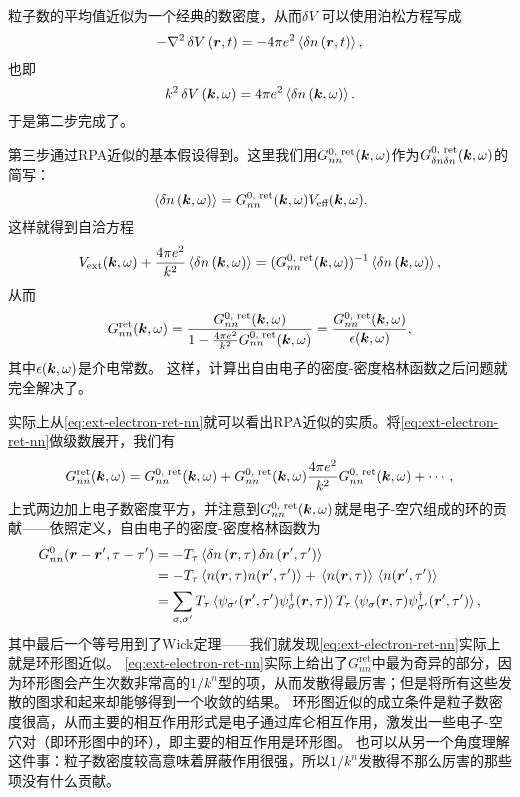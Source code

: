 \documentclass[hyperref, UTF8, a4paper]{ctexart}
\begin{document}
粒子数的平均值近似为一个经典的数密度，从而$\var{V}$可以使用泊松方程写成
\[
    - \laplacian \var{V}(\vb*{r}, t) = - 4\pi e^2 \expval*{\var{{n}}(\vb*{r}, t)},
\]
也即
\begin{equation}
    k^2 \var{V}(\vb*{k}, \omega) = 4\pi e^2 \expval*{\var{{n}}(\vb*{k}, \omega)}.
\end{equation}
于是第二步完成了。

第三步通过RPA近似的基本假设得到。这里我们用$G^\text{0, ret}_{nn} (\vb*{k}, \omega)$作为$G^\text{0, ret}_{\var{n}\var{n}} (\vb*{k}, \omega)$的简写：
\begin{equation}
    \expval*{\var{{n}}(\vb*{k}, \omega)} = G^\text{0, ret}_{nn} (\vb*{k}, \omega) V_\text{eff} (\vb*{k}, \omega).
    \label{eq:rpa-approximation}
\end{equation}
这样就得到自洽方程
\[
    V_\text{ext}(\vb*{k}, \omega) + \frac{4\pi e^2}{k^2} \expval*{\var{{n}}(\vb*{k}, \omega)} = (G^\text{0, ret}_{nn} (\vb*{k}, \omega))^{-1} \expval*{\var{{n}}(\vb*{k}, \omega)},
\]
从而
\begin{equation}
    G^\text{ret}_{nn}(\vb*{k}, \omega) = \frac{G^\text{0, ret}_{nn}(\vb*{k}, \omega)}{1 - \frac{4\pi e^2}{k^2} G^\text{0, ret}_{nn}(\vb*{k}, \omega)} = \frac{G^\text{0, ret}_{nn}(\vb*{k}, \omega)}{\epsilon(\vb*{k}, \omega)},
    \label{eq:ext-electron-ret-nn}
\end{equation}
其中$\epsilon(\vb*{k}, \omega)$是介电常数。
这样，计算出自由电子的密度-密度格林函数之后问题就完全解决了。

实际上从\eqref{eq:ext-electron-ret-nn}就可以看出RPA近似的实质。将\eqref{eq:ext-electron-ret-nn}做级数展开，我们有
\[
    G^\text{ret}_{nn}(\vb*{k}, \omega) = G^\text{0, ret}_{nn}(\vb*{k}, \omega) + G^\text{0, ret}_{nn}(\vb*{k}, \omega) \frac{4\pi e^2}{k^2} G^\text{0, ret}_{nn}(\vb*{k}, \omega) + \cdots,
\]
上式两边加上电子数密度平方，并注意到$G^\text{0, ret}_{nn}(\vb*{k}, \omega)$就是电子-空穴组成的环的贡献——依照定义，自由电子的密度-密度格林函数为
\[
    \begin{aligned}
        G_{nn}^\text{0}(\vb*{r}-\vb*{r}', \tau-\tau') &= - T_\tau \expval*{\var{{n}}(\vb*{r}, \tau) \var{{n}}(\vb*{r}', \tau')} \\
        &= - T_\tau \expval*{{{n}}(\vb*{r}, \tau) {{n}}(\vb*{r}', \tau')} + \expval*{{n}(\vb*{r}, \tau)} \expval*{{n}(\vb*{r}', \tau')} \\
        &= \sum_{\sigma, \sigma'} T_\tau \expval*{{\psi}_{\sigma'}(\vb*{r}', \tau') {\psi}^\dagger_\sigma(\vb*{r}, \tau)} T_\tau \expval*{ {\psi}_\sigma(\vb*{r}, \tau) {\psi}^\dagger_{\sigma'}(\vb*{r}', \tau') } ,
    \end{aligned}
\]
其中最后一个等号用到了Wick定理——我们就发现\eqref{eq:ext-electron-ret-nn}实际上就是环形图近似。
\eqref{eq:ext-electron-ret-nn}实际上给出了$G^\text{ret}_{nn}$中最为奇异的部分，因为环形图会产生次数非常高的$1/k^n$型的项，从而发散得最厉害；但是将所有这些发散的图求和起来却能够得到一个收敛的结果。
环形图近似的成立条件是粒子数密度很高，从而主要的相互作用形式是电子通过库仑相互作用，激发出一些电子-空穴对（即环形图中的环），即主要的相互作用是环形图。
也可以从另一个角度理解这件事：粒子数密度较高意味着屏蔽作用很强，所以$1/k^n$发散得不那么厉害的那些项没有什么贡献。
\end{document}
